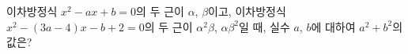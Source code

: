 이차방정식 $x^2-ax+b=0$의 두 근이 $\alpha$, $\beta$이고, 이차방정식 $x^2-(3a-4)x-b+2=0$의 두 근이 $\alpha^2\beta$, $\alpha\beta^2$일 때, 실수 $a$, $b$에 대하여 $a^2+b^2$의 값은?
